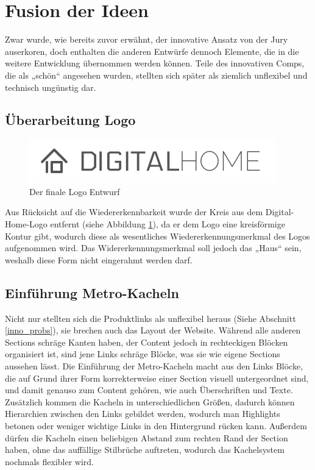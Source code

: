\section{Fusion der Ideen}
Zwar wurde, wie bereits zuvor erwähnt, der innovative Ansatz von der Jury auserkoren, doch enthalten die anderen Entwürfe dennoch Elemente, die in die weitere Entwicklung übernommen werden können. Teile des innovativen Comps, die als „schön“ angesehen wurden, stellten sich später als ziemlich unflexibel und technisch ungünstig dar.
\subsection{Überarbeitung Logo}
\begin{figure} [hp]
\includegraphics[width=\textwidth]{./img/logo3.png}
\caption{Der finale Logo Entwurf}
\label{logo3}
\end{figure}
Aus Rücksicht auf die Wiedererkennbarkeit wurde der Kreis aus dem Digital-Home-Logo entfernt (siehe Abbildung \ref{logo3}), da er dem Logo eine kreisförmige Kontur gibt, wodurch diese als wesentliches Wiedererkennungsmerkmal des Logos aufgenommen wird. Das Widererkennungsmerkmal soll jedoch das „Haus“ sein, weshalb diese Form nicht eingerahmt werden darf.

\subsection{Einführung Metro-Kacheln}
Nicht nur stellten sich die Produktlinks als unflexibel heraus (Siehe Abschnitt \ref{inno_probs}), sie brechen auch das Layout der Website. Während alle anderen Sections schräge Kanten haben, der Content jedoch in rechteckigen Blöcken organisiert ist, sind jene Links schräge Blöcke, was sie wie eigene Sections aussehen lässt. Die Einführung der Metro-Kacheln macht aus den Links Blöcke, die auf Grund ihrer Form korrekterweise einer Section visuell untergeordnet sind, und damit genauso zum Content gehören, wie auch Überschriften und Texte. Zusätzlich kommen die Kacheln in unterschiedlichen Größen, dadurch können Hierarchien zwischen den Links gebildet werden, wodurch man Highlights betonen oder weniger wichtige Links in den Hintergrund rücken kann. Außerdem dürfen die Kacheln einen beliebigen Abstand zum rechten Rand der Section haben, ohne das auffällige Stilbrüche auftreten, wodurch das Kachelsystem nochmals flexibler wird.

